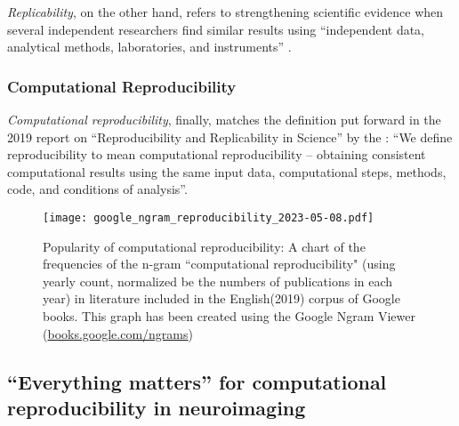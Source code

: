 \textit{Replicability}, on the other hand, refers to strengthening scientific evidence when several independent researchers find similar results using ``independent data, analytical methods, laboratories, and instruments'' \citep{peng2006}.

\subsubsection{Computational Reproducibility}

\textit{Computational reproducibility}, finally, matches the definition put forward in the 2019 report on ``Reproducibility and Replicability in Science'' by the \citet{engineering2019reproducibility}: ``We define reproducibility to mean computational reproducibility -- obtaining consistent computational results using the same input data, computational steps, methods, code, and conditions of analysis''.


\begin{figure}
	\centering
	\texttt{[image: google\_ngram\_reproducibility\_2023-05-08.pdf]}
	\caption[Computational reproducibility in the literature]{Popularity of computational reproducibility: A chart of the frequencies of the n-gram ``computational reproducibility" (using yearly count, normalized be the numbers of publications in each year) in literature included in the English(2019) corpus of Google books. This graph has been created using the Google Ngram Viewer (\href{https://books.google.com/ngrams/info}{books.google.com/ngrams}) \citep{michel2011quantitative}}
	\label{fig:ngram}
\end{figure}


\subsection{``Everything matters'' for computational reproducibility in neuroimaging}


